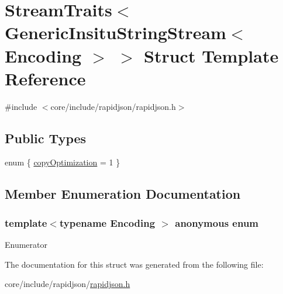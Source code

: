 \hypertarget{structStreamTraits_3_01GenericInsituStringStream_3_01Encoding_01_4_01_4}{}\section{Stream\+Traits$<$ Generic\+Insitu\+String\+Stream$<$ Encoding $>$ $>$ Struct Template Reference}
\label{structStreamTraits_3_01GenericInsituStringStream_3_01Encoding_01_4_01_4}


{\ttfamily \#include $<$core/include/rapidjson/rapidjson.\+h$>$}

\subsection*{Public Types}
\begin{DoxyCompactItemize}
\item 
enum \{ \hyperlink{structStreamTraits_3_01GenericInsituStringStream_3_01Encoding_01_4_01_4_a67a610522828f475093e1e3c3b51a793a8d0f051fca7788dc2aeaadd6e5a153ed}{copy\+Optimization} = 1
 \}
\end{DoxyCompactItemize}


\subsection{Member Enumeration Documentation}
\subsubsection[{\texorpdfstring{anonymous enum}{anonymous enum}}]{\setlength{\rightskip}{0pt plus 5cm}template$<$typename Encoding $>$ anonymous enum}\hypertarget{structStreamTraits_3_01GenericInsituStringStream_3_01Encoding_01_4_01_4_a67a610522828f475093e1e3c3b51a793}{}\label{structStreamTraits_3_01GenericInsituStringStream_3_01Encoding_01_4_01_4_a67a610522828f475093e1e3c3b51a793}
\begin{Desc}
\item[Enumerator]\par
\begin{description}
\item[{\em 
copy\+Optimization\hypertarget{structStreamTraits_3_01GenericInsituStringStream_3_01Encoding_01_4_01_4_a67a610522828f475093e1e3c3b51a793a8d0f051fca7788dc2aeaadd6e5a153ed}{}\label{structStreamTraits_3_01GenericInsituStringStream_3_01Encoding_01_4_01_4_a67a610522828f475093e1e3c3b51a793a8d0f051fca7788dc2aeaadd6e5a153ed}
}]\end{description}
\end{Desc}


The documentation for this struct was generated from the following file\+:\begin{DoxyCompactItemize}
\item 
core/include/rapidjson/\hyperlink{rapidjson_8h}{rapidjson.\+h}\end{DoxyCompactItemize}
